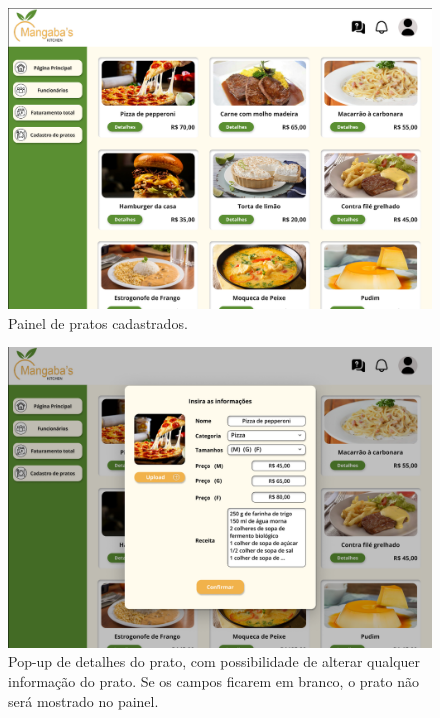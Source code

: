 \begin{center}
\begin{figure}[!htp]
        \includegraphics[width=1\textwidth]{imagens-template/Layout_Gerente_2651.png} 
        \caption{Painel de pratos cadastrados.}
    \end{figure}
    \newpage
    \begin{figure}[!htp]
        \includegraphics[width=1\textwidth]{imagens-template/Layout_Gerente_2649.png} 
        \caption{Pop-up de detalhes do prato, com possibilidade de alterar qualquer informação do prato. Se os campos ficarem em branco, o prato não será mostrado no painel.}
    \end{figure}
    \newpage
    \begin{figure}[!htp]

\end{figure}
\end{center}
